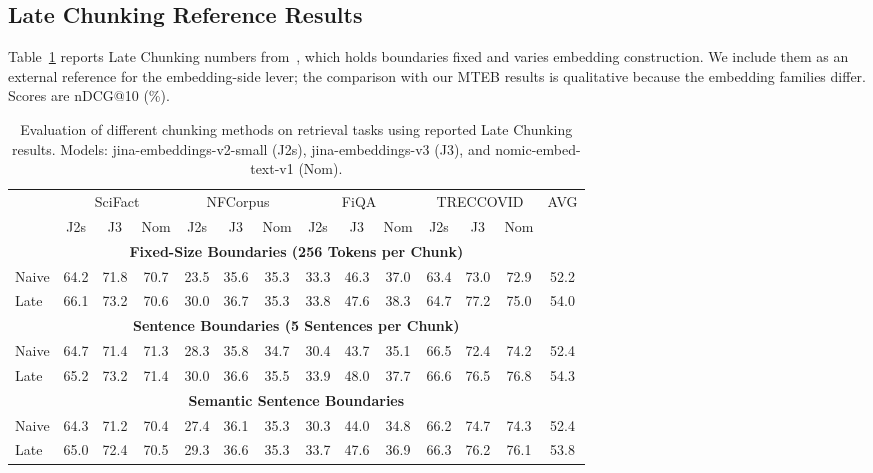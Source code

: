 \subsection{Late Chunking Reference Results}
Table~\ref{tab:late_chunking_results} reports Late Chunking numbers from~\cite{gunther2024late}, which holds boundaries fixed and varies embedding construction. We include them as an external reference for the embedding-side lever; the comparison with our MTEB results is qualitative because the embedding families differ. Scores are nDCG@10 (\%).

\begin{table}[t]
\centering
\caption{Evaluation of different chunking methods on retrieval tasks using reported Late Chunking results. Models: jina-embeddings-v2-small (J2s), jina-embeddings-v3 (J3), and nomic-embed-text-v1 (Nom).}
\label{tab:late_chunking_results}
\begin{adjustbox}{width=\textwidth}
\begin{tabular}{l|ccc|ccc|ccc|ccc|c}
\toprule
& \multicolumn{3}{c|}{SciFact} & \multicolumn{3}{c|}{NFCorpus} & \multicolumn{3}{c|}{FiQA} & \multicolumn{3}{c|}{TRECCOVID} & AVG \\
& J2s & J3 & Nom & J2s & J3 & Nom & J2s & J3 & Nom & J2s & J3 & Nom & \\
\midrule
\multicolumn{14}{c}{\textbf{Fixed-Size Boundaries (256 Tokens per Chunk)}} \\
Naive & 64.2 & 71.8 & 70.7 & 23.5 & 35.6 & 35.3 & 33.3 & 46.3 & 37.0 & 63.4 & 73.0 & 72.9 & 52.2 \\
Late  & 66.1 & 73.2 & 70.6 & 30.0 & 36.7 & 35.3 & 33.8 & 47.6 & 38.3 & 64.7 & 77.2 & 75.0 & 54.0 \\
\midrule
\multicolumn{14}{c}{\textbf{Sentence Boundaries (5 Sentences per Chunk)}} \\
Naive & 64.7 & 71.4 & 71.3 & 28.3 & 35.8 & 34.7 & 30.4 & 43.7 & 35.1 & 66.5 & 72.4 & 74.2 & 52.4 \\
Late  & 65.2 & 73.2 & 71.4 & 30.0 & 36.6 & 35.5 & 33.9 & 48.0 & 37.7 & 66.6 & 76.5 & 76.8 & 54.3 \\
\midrule
\multicolumn{14}{c}{\textbf{Semantic Sentence Boundaries}} \\
Naive & 64.3 & 71.2 & 70.4 & 27.4 & 36.1 & 35.3 & 30.3 & 44.0 & 34.8 & 66.2 & 74.7 & 74.3 & 52.4 \\
Late  & 65.0 & 72.4 & 70.5 & 29.3 & 36.6 & 35.3 & 33.7 & 47.6 & 36.9 & 66.3 & 76.2 & 76.1 & 53.8 \\
\bottomrule
\end{tabular}
\end{adjustbox}
\end{table}

